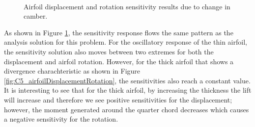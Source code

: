 \begin{figure}[H]
    \centering
    \quad
    \\
    \quad
    \caption{Airfoil displacement and rotation sensitivity results due to change in camber.}
    \label{fig:C5_airfoilSensitivityTimeHistory}
\end{figure}
%
As shown in Figure \ref{fig:C5_airfoilSensitivityTimeHistory}, the sensitivity response flows the same pattern as the analysis solution for this problem. For the oscillatory response of the thin airfoil, the sensitivity solution also moves between two extremes for both the displacement and airfoil rotation. However, for the thick airfoil that shows a divergence charachteristic as shown in Figure \ref{fig:C5_airfoilDisplacementRotation}, the sensitivities also reach a constant value. It is interesting to see that for the thick airfoil, by increasing the thickness the lift will increase and therefore we see positive sensitivities for the displacement; however, the moment generated around the quarter chord decreases which causes a negative sensitivity for the rotation.

